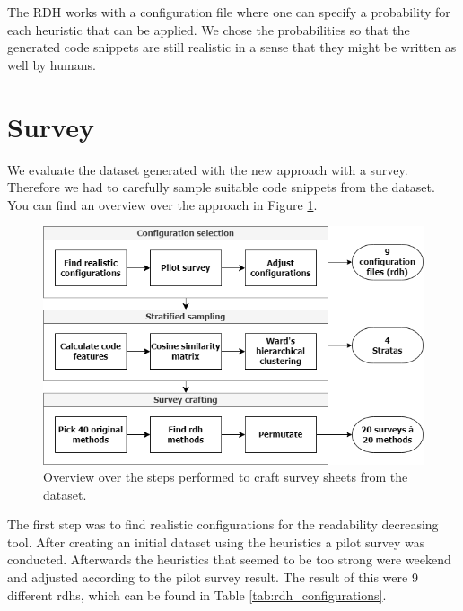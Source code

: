 \documentclass[%
class=scrreprt,
chapterprefix=false,%
open=right,%
twoside=false,%
paper=a4,%
logofile={Logo\_zentral\_farbig\_EN.png},%
thesistype=master,%
UKenglish,%
]{se2thesis}
\begin{document}
	The RDH works with a configuration file where one can specify a probability for each heuristic that can be applied. We chose the probabilities so that the generated code snippets are still realistic in a sense that they might be written as well by humans.
	
\section{Survey} \label{Survey}
	We evaluate the dataset generated with the new approach with a survey. Therefore we had to carefully sample suitable code snippets from the dataset. You can find an overview over the approach in Figure \ref{fig:survey_pipeline}.
	
	\begin{figure}[t]
		\centering
		\includegraphics[width=\textwidth]{img/survey_pipeline.png}
		\caption{Overview over the steps performed to craft survey sheets from the dataset.}
		\label{fig:survey_pipeline}
	\end{figure}
	
	The first step was to find realistic configurations for the readability decreasing tool. After creating an initial dataset using the heuristics a pilot survey was conducted. Afterwards the heuristics that seemed to be too strong were weekend and adjusted according to the pilot survey result. The result of this were 9 different rdhs, which can be found in Table \ref{tab:rdh_configurations}.
	
\end{document}
